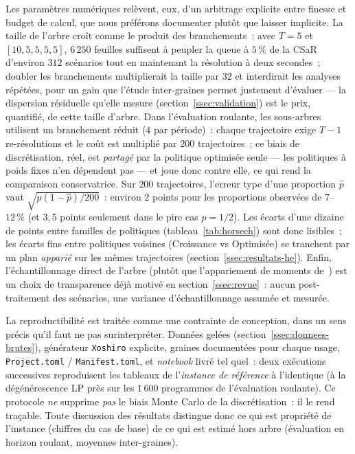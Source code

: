 \documentclass[11pt,letterpaper]{article}
\theoremstyle{definition}
\begin{document}
Les paramètres numériques relèvent, eux, d'un arbitrage explicite entre
finesse et budget de calcul, que nous préférons documenter plutôt que
laisser implicite. La taille de l'arbre croît comme le produit des
branchements~: avec $T = 5$ et $[10,5,5,5,5]$, $6\,250$ feuilles suffisent à
peupler la queue à $5\,\%$ de la CSaR d'environ $312$ scénarios tout en
maintenant la résolution à deux secondes~; doubler les branchements
multiplierait la taille par $32$ et interdirait les analyses répétées, pour
un gain que l'étude inter-graines permet justement d'évaluer --- la
dispersion résiduelle qu'elle mesure (section~\ref{ssec:validation}) est le
prix, quantifié, de cette taille d'arbre. Dans l'évaluation roulante, les
sous-arbres utilisent un branchement réduit ($4$ par période)~: chaque
trajectoire exige $T-1$ re-résolutions et le coût est multiplié par
$200$ trajectoires~; ce biais de discrétisation, réel, est
\emph{partagé} par la politique optimisée seule --- les politiques à poids
fixes n'en dépendent pas --- et joue donc contre elle, ce qui rend la
comparaison conservatrice. Sur $200$ trajectoires, l'erreur type d'une proportion $\hat p$ vaut
$\sqrt{\hat p(1-\hat p)/200}$~: environ $2$ points pour les proportions
observées de $7$--$12\,\%$ (et $3{,}5$ points seulement dans le pire cas
$p = 1/2$). Les écarts d'une dizaine de points entre familles de politiques
(tableau~\ref{tab:horsech}) sont donc lisibles~; les écarts fins entre
politiques voisines (Croissance vs Optimisée) se tranchent par un plan
\emph{apparié} sur les mêmes trajectoires
(section~\ref{ssec:resultats-he}). Enfin, l'échantillonnage direct de l'arbre (plutôt que l'appariement
de moments de~\cite{HoylandWallace2001}) est un choix de transparence déjà
motivé en section~\ref{ssec:revue}~: aucun post-traitement des scénarios,
une variance d'échantillonnage assumée et mesurée.

La reproductibilité est traitée comme une contrainte de conception, dans un
sens précis qu'il faut ne pas surinterpréter. Données gelées
(section~\ref{ssec:donnees-brutes}), générateur \texttt{Xoshiro} explicite,
graines documentées pour chaque usage, \texttt{Project.toml} /
\texttt{Manifest.toml}, et \emph{notebook} livré tel quel~: deux exécutions
successives reproduisent les tableaux de l'\emph{instance de référence} à
l'identique (à la dégénérescence LP près sur les $1\,600$ programmes de
l'évaluation roulante). Ce protocole \emph{ne} supprime \emph{pas} le biais
Monte Carlo de la discrétisation~: il le rend traçable. Toute discussion des
résultats distingue donc ce qui est propriété de l'instance (chiffres du cas
de base) de ce qui est estimé hors arbre (évaluation en horizon roulant,
moyennes inter-graines).
\end{document}
